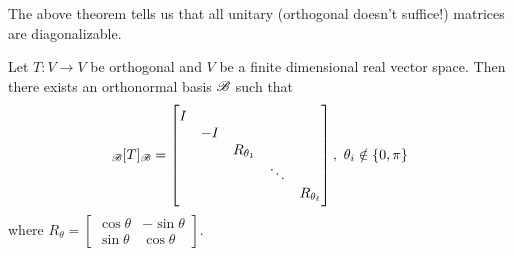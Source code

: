 \documentclass{styles/tufte}
\begin{document}
  The above theorem tells us that all unitary (orthogonal doesn't suffice!) matrices are diagonalizable.
  
  \begin{theorem}{}{}
    Let $T: V \to V$ be orthogonal and $V$ be a finite dimensional real vector space. Then there exists an orthonormal basis $\mathscr{B}$ such that
    \[ {}_{\mathscr{B}}[T]_{\mathscr{B}} = \begin{bmatrix}
      I &&&& \\
      & -I &&& \\
      && R_{\theta_1} && \\
      &&& \ddots & \\
      &&&& R_{\theta_\ell}
    \end{bmatrix},\ \theta_i \notin \set{0, \pi} \]
    where $\displaystyle R_\theta = \begin{bmatrix} \cos\theta & -\sin\theta \\ \sin\theta & \cos\theta \end{bmatrix}$.
  \end{theorem}
\end{document}
